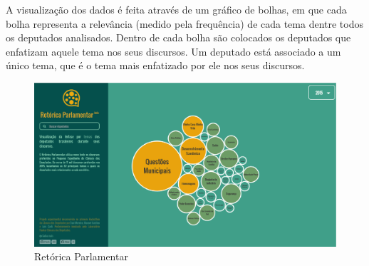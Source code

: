 A visualização dos dados é feita através de um gráfico de bolhas, em que cada bolha representa a relevância (medido pela frequência) de cada tema dentre todos os deputados analisados. Dentro de cada bolha são colocados os deputados que enfatizam aquele tema nos seus discursos. Um deputado está associado a um único tema, que é o tema mais enfatizado por ele nos seus discursos.

\begin{figure}[h]
    \centering
    \includegraphics[scale=0.3]{figuras/retorica.eps}
    \caption{Retórica Parlamentar}
\end{figure}

